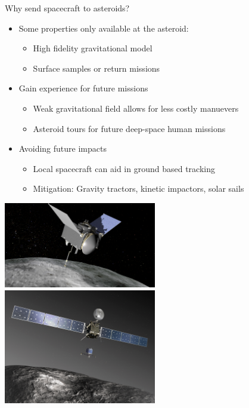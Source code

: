 \begin{frame}[t]{Why send spacecraft to asteroids?}
    \begin{itemize}
        \item Some properties only available at the asteroid:
            \begin{itemize}
                \item High fidelity gravitational model
                \item Surface samples or return missions
            \end{itemize}
        \item Gain experience for future missions
            \begin{itemize}
                \item Weak gravitational field allows for less costly manuevers
                \item Asteroid tours for future deep-space human missions
            \end{itemize}
        \item Avoiding future impacts
            \begin{itemize}
                \item Local spacecraft can aid in ground based tracking
                \item Mitigation: Gravity tractors, kinetic impactors, solar sails
            \end{itemize}
    \end{itemize}

\begin{center}
    \includegraphics[width=0.5\textwidth,height=0.2\textheight,keepaspectratio]{figures/osires_rex.png}
    ~
    \includegraphics[width=0.5\textwidth,height=0.2\textheight,keepaspectratio]{figures/Rosetta-and-Philae.jpg}
\end{center}

\end{frame}